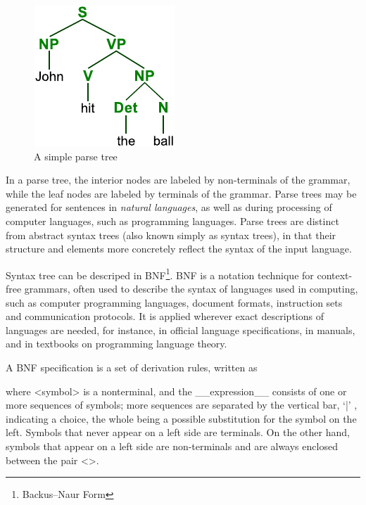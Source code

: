 \begin{figure}
\begin{center}
\includegraphics{../ParseTree}
\caption{A simple parse tree}
\end{center}\end{figure}In a parse tree,  the interior nodes are labeled by non-terminals of the grammar, while the leaf nodes are labeled by terminals of the grammar. Parse trees may be generated for sentences in {\em \mbox{natural} \mbox{languages}},  as well as during processing of computer languages, such as programming languages. Parse trees are \mbox{distinct} from abstract syntax trees (also known \mbox{simply} as syntax trees), in that their structure and \mbox{elements} more concretely reflect the syntax of the \mbox{input} language.

Syntax tree  can be descriped in BNF\footnote{Backus–Naur Form}.
BNF\cite{BNF} is a notation technique for context-free grammars, often used to describe the syntax of languages used in computing, such as computer programming languages, document formats, instruction sets and communication protocols. It is applied wherever exact descriptions of languages are needed, for instance, in official language specifications, in manuals, and in textbooks on programming language theory.

A BNF specification is a set of derivation rules, written as

where <symbol> is a nonterminal, and the \_\_expression\_\_ consists of one or more sequences of symbols; more sequences are separated by the vertical bar, `|' , indicating a choice, the whole being a possible substitution for the symbol on the left. Symbols that never appear on a left side are terminals. On the other hand, symbols that appear on a left side are non-terminals and are always enclosed between the pair <>.

